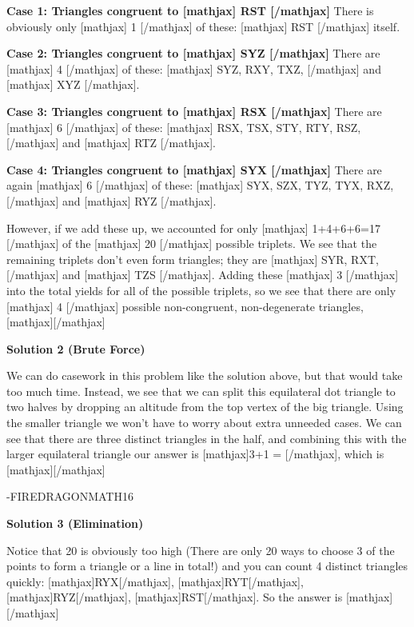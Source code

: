 \begin{enumerate}
 \textbf{Case 1: Triangles congruent to [mathjax] \triangle RST [/mathjax]} There is obviously only [mathjax] 1 [/mathjax] of these: [mathjax] \triangle RST [/mathjax] itself.

 \textbf{Case 2: Triangles congruent to [mathjax] \triangle SYZ [/mathjax]} There are [mathjax] 4 [/mathjax] of these: [mathjax] \triangle SYZ, \triangle RXY, \triangle TXZ, [/mathjax] and [mathjax] \triangle XYZ [/mathjax].

 \textbf{Case 3: Triangles congruent to [mathjax] \triangle RSX [/mathjax]} There are [mathjax] 6 [/mathjax] of these: [mathjax] \triangle RSX, \triangle TSX, \triangle STY, \triangle RTY, \triangle RSZ, [/mathjax] and [mathjax] \triangle RTZ [/mathjax].

 \textbf{Case 4: Triangles congruent to [mathjax] \triangle SYX [/mathjax]} There are again [mathjax] 6 [/mathjax] of these: [mathjax] \triangle SYX, \triangle SZX, \triangle TYZ, \triangle TYX, \triangle RXZ, [/mathjax] and [mathjax] \triangle RYZ [/mathjax].

 However, if we add these up, we accounted for only [mathjax] 1+4+6+6=17 [/mathjax] of the [mathjax] 20 [/mathjax] possible triplets. We see that the remaining triplets don't even form triangles; they are [mathjax] SYR, RXT, [/mathjax] and [mathjax] TZS [/mathjax]. Adding these [mathjax] 3 [/mathjax] into the total yields for all of the possible triplets, so we see that there are only [mathjax] 4 [/mathjax] possible non-congruent, non-degenerate triangles, [mathjax][/mathjax]

 



\textbf{Solution 2 (Brute Force)}

We can do casework in this problem like the solution above, but that would take too much time. Instead, we see that we can split this equilateral dot triangle to two halves by dropping an altitude from the top vertex of the big triangle. Using the smaller triangle we won't have to worry about extra unneeded cases. We can see that there are three distinct triangles in the half, and combining this with the larger equilateral triangle our answer is [mathjax]3+1 = [/mathjax], which is [mathjax][/mathjax]

 -FIREDRAGONMATH16

 



\textbf{Solution 3 (Elimination)}

Notice that 20 is obviously too high (There are only 20 ways to choose 3 of the points to form a triangle or a line in total!) and you can count 4 distinct triangles quickly: [mathjax]\triangle RYX[/mathjax], [mathjax]\triangle RYT[/mathjax], [mathjax]\triangle RYZ[/mathjax], [mathjax]\triangle RST[/mathjax]. So the answer is [mathjax][/mathjax]


\end{enumerate}
